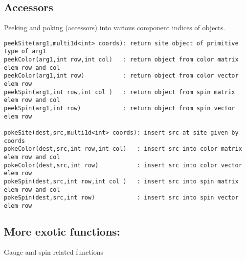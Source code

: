 \documentclass[12pt,letterpaper]{article}
\begin{document}
\medskip

\subsection{Accessors}
\label{sec:peek}

Peeking and poking (accessors) into various component indices of objects.

\begin{verbatim}
peekSite(arg1,multi1d<int> coords): return site object of primitive type of arg1
peekColor(arg1,int row,int col)   : return object from color matrix elem row and col
peekColor(arg1,int row)           : return object from color vector elem row
peekSpin(arg1,int row,int col )   : return object from spin matrix elem row and col
peekSpin(arg1,int row)            : return object from spin vector elem row

pokeSite(dest,src,multi1d<int> coords): insert src at site given by coords
pokeColor(dest,src,int row,int col)   : insert src into color matrix elem row and col
pokeColor(dest,src,int row)           : insert src into color vector elem row
pokeSpin(dest,src,int row,int col )   : insert src into spin matrix elem row and col
pokeSpin(dest,src,int row)            : insert src into spin vector elem row
\end{verbatim}


\medskip

\subsection{More exotic functions:}
\label{sec:otherfuncs}

Gauge and spin related functions
\end{document}
